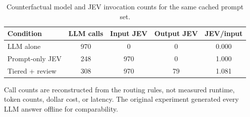 \begin{table}[t]
\centering
\small
\caption{Counterfactual model and JEV invocation counts for the same cached prompt set.}
\label{tab:jev_calls}
\begin{tabular}{lcccc}
\toprule
Condition & LLM calls & Input JEV & Output JEV & JEV/input \\
\midrule
LLM alone & 970 & 0 & 0 & 0.000 \\
Prompt-only JEV & 248 & 970 & 0 & 1.000 \\
Tiered + review & 308 & 970 & 79 & 1.081 \\
\bottomrule
\end{tabular}
\par\vspace{2pt}
\begin{minipage}{0.97\linewidth}
\footnotesize Call counts are reconstructed from the routing rules, not measured runtime, token counts, dollar cost, or latency. The original experiment generated every LLM answer offline for comparability.
\end{minipage}
\end{table}
